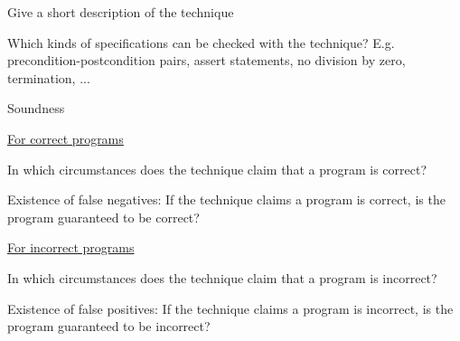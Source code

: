 \documentclass[a4paper]{article}
\begin{document}
\begin{minipage}[t]{0.16\linewidth}
	\raggedright
	\begin{betterlist}
		\item Give a short description of the technique
		\item Which kinds of specifications can be checked with the technique? E.g. precondition-postcondition pairs, assert statements, no division by zero, termination, ...

		\item \alert{Soundness}
		\begin{betterlist}
			\item \underline{For correct programs}
			\begin{betterlist}
				\item In which circumstances does the technique claim that a program is correct?

				\item Existence of false negatives: If the technique claims a program is correct, is the program guaranteed to be correct?

			\end{betterlist}
			\item \underline{For incorrect programs}
			\begin{betterlist}
				\item In which circumstances does the technique claim that a program is incorrect?

				\framebox[0.95\textwidth][l]{\parbox{0.90\textwidth}{
						\begin{betterlist}
							\item TODO
						\end{betterlist}
					}}
				\item Existence of false positives: If the technique claims a program is incorrect, is the program guaranteed to be incorrect?


\end{betterlist}
\end{betterlist}
\end{betterlist}
\end{minipage}
\end{document}
